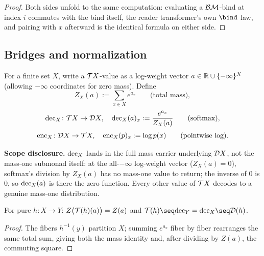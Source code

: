 \begin{proof}
\leanok
Both sides unfold to the same computation: evaluating a
$\mathcal B\mathcal M$-bind at index $i$ commutes with the bind itself, the
reader transformer's own $\bind$ law, and pairing with $x$ afterward
is the identical formula on either side.
\end{proof}

\subsection{Bridges and normalization}  %
\label{sec:bridges}


\begin{definition}
\label{def:dec-enc-mass}
\leanok
For a finite set $X$, write a $\mathcal T X$-value as a log-weight vector
$a \in \mathbb R \cup \{-\infty\}^X$ (allowing $-\infty$ coordinates for zero mass). Define
\[
  Z_X(a) := \sum_{x \in X} e^{a_x} \qquad \text{(total mass)},
\]
\[
  \mathrm{dec}_X \colon \mathcal T X \to \mathcal D X, \quad \mathrm{dec}_X(a)_x := \frac{e^{a_x}}{Z_X(a)}
  \qquad \text{(softmax)},
\]
\[
  \mathrm{enc}_X \colon \mathcal D X \to \mathcal T X, \quad \mathrm{enc}_X(p)_x := \log p(x)
  \qquad \text{(pointwise log)}.
\]
\end{definition}

\textbf{Scope disclosure.} $\mathrm{dec}_X$ lands in the full mass carrier
underlying $\mathcal D X$, not the mass-one submonad itself: at the all-$-\infty$
log-weight vector ($Z_X(a) = 0$), softmax's division by $Z_X(a)$ has no
mass-one value to return; the inverse of $0$ is $0$, so $\mathrm{dec}_X(a)$ is
there the zero function. Every other value of $\mathcal T X$ decodes to
a genuine mass-one distribution.

\begin{lemma}
\label{lem:pure-maps}
\leanok
For pure $h \colon X \to Y$: $Z\bigl(\mathcal T(h)(a)\bigr) = Z(a)$ and
$\Tmon(h) \seq \dec_Y = \dec_X \seq \Dmon(h)$.
\end{lemma}

\begin{proof}
\leanok
The fibers $h^{-1}(y)$ partition $X$; summing $e^{a_x}$
fiber by fiber rearranges the same total sum, giving both the mass
identity and, after dividing by $Z(a)$, the commuting square.
\end{proof}

